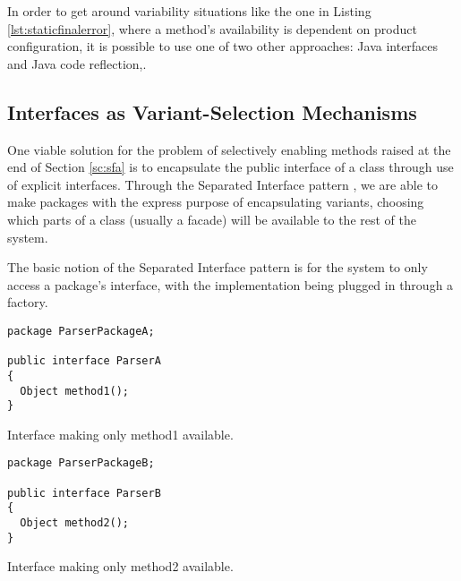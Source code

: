 In order to get around \gls{variability} situations like the one in Listing \ref{lst:staticfinalerror}, where a method's availability is dependent on product configuration, it is possible to use one of two other approaches: Java interfaces and Java code reflection,.


\subsection{Interfaces as Variant-Selection Mechanisms}
\label{sc:interfaces}

One viable solution for the problem of selectively enabling methods raised at the end of Section \ref{sc:sfa} is to encapsulate the public interface of a class through use of explicit interfaces. Through the Separated Interface pattern \cite{FOWLER:2002}, we are able to make packages with the express purpose of encapsulating \gls{variant}s, choosing which parts of a class (usually a facade) will be available to the rest of the system.

The basic notion of the Separated Interface pattern is for the system to only access a package's interface, with the implementation being plugged in through a factory.

\begin{listing}
\begin{verbatim}
package ParserPackageA;

public interface ParserA
{
  Object method1();
}
\end{verbatim}
\caption{Interface making only method1 available.} \label{lst:interface1}
\end{listing}

\begin{listing}
\begin{verbatim}
package ParserPackageB;

public interface ParserB
{
  Object method2();
}
\end{verbatim}
\caption{Interface making only method2 available.} \label{lst:interface2}
\end{listing}

